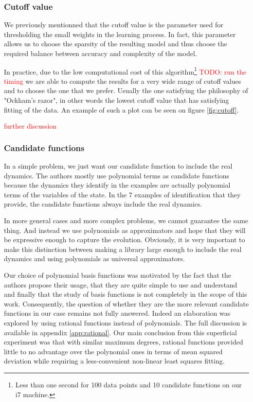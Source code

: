 \documentclass[12pt, letterpaper]{article}
\newcommand{\com}[1] {{\small {\fontfamily{ptm} \selectfont \textcolor{red}{#1}}}}
\begin{document}
\subsubsection{Cutoff value}

We previously mentionned that the cutoff value is the parameter used for thresholding the small weights in the learning process. In fact, this parameter allows us to choose the sparsity of the resulting model and thus choose the required balance between accuracy and complexity of the model.

In practice, due to the low computational cost of this algorithm\footnote{Less than one second for 100 data points and 10 candidate functions on our i7 machine.} \com{TODO: run the timing} we are able to compute the results for a very wide range of cutoff values and to choose the one that we prefer. Usually the one satisfying the philosophy of "Ockham's razor", in other words the lowest cutoff value that has satisfying fitting of the data. An example of such a plot can be seen on figure \ref{fig:cutoff}. 

\com{further discussion}

\subsubsection{Candidate functions}\label{sec:polynomials}

In a simple problem, we just want our candidate function to include the real dynamics. 
The authors mostly use polynomial terms as candidate functions because the dynamics they identify in the examples are actually polynomial terms of the variables of the state. 
In the 7 examples of identification that they provide, the candidate functions always include the real dynamics. 

In more general cases and more complex problems, we cannot guarantee the same thing. 
And instead we use polynomials as approximators and hope that they will be expressive enough to capture the evolution. 
Obviously, it is very important to make this distinction between making a library large enough to include the real dynamics and using polynomials as universal approximators. 

Our choice of polynomial basis functions was motivated by the fact that the authors propose their usage, that they are quite simple to use and understand and finally that the study of basis functions is not completely in the scope of this work. Consequently, the question of whether they are the more relevant candidate functions in our case remains not fully answered. Indeed an elaboration was explored by using rational functions instead of polynomials. The full discussion is available in appendix \ref{app:rational}. Our main conclusion from this superficial experiment was that with similar maximum degrees, rational functions provided little to no advantage over the polynomial ones in terms of mean squared deviation while requiring a less-convenient non-linear least squares fitting.
\end{document}
